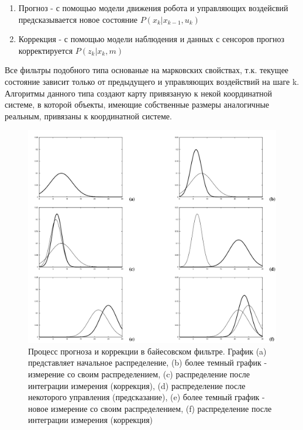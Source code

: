 \documentclass[a4paper, 14pt]{extreport}
\begin{document}
\begin{enumerate}
        \item Прогноз - с помощью модели движения робота и управляющих воздейсвий предсказывается новое состояние \(P(x_k|x_{k-1},u_k)\)
        \item Коррекция - с помощью модели наблюдения и данных с сенсоров прогноз корректируется \(P(z_k|x_k,m)\)
\end{enumerate}
\par Все фильтры подобного типа основаные на марковских свойствах, т.к. текущее состояние зависит только от предыдущего и управляющих 
воздействий на шаге k. Алгоритмы данного типа создают карту привязаную к некой координатной системе, в которой объекты, имеющие
собственные размеры аналогичные реальным, привязаны к координатной системе.
\begin{figure}[ht]
\begin{center}
\includegraphics[scale = 0.3]{./figure/bayes_filter_process}
\caption{Процесс прогноза и коррекции в байесовском фильтре. График (a) представляет начальное распределение, (b) более темный график -
измерение со своим распределением, (c) распределение после интеграции измерения (коррекция), (d) распределение после некоторого управления (предсказание),
(e) более темный график - новое измерение со своим распределением, (f) распределение после интеграции измерения (коррекция)}
\label{fig:manip_photo}
\end{center}
\end{figure}
\end{document}
